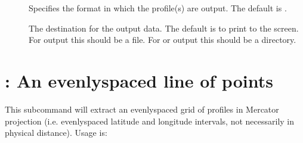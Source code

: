 \documentclass[letterpaper,10pt,english]{sphinxmanual}
\begin{document}
\sphinxAtStartPar
{}
\begin{description}
\item[{}] \leavevmode
\sphinxAtStartPar
Specifies the format in which the profile(s) are output.  The default is .

\item[{}] \leavevmode
\sphinxAtStartPar
The destination for the output data.  The default is to print to the screen.  For  output this should be a file.  For  or  output this should be a directory.

\item[{}] \leavevmode
\sphinxAtStartPar
{}

\sphinxAtStartPar
{}

\end{description}


\section{: An evenly\sphinxhyphen{}spaced line of points}
\label{\detokenize{userguide:id1}}
\sphinxAtStartPar
This subcommand will extract an evenly\sphinxhyphen{}spaced grid of profiles in Mercator projection (i.e. evenly\sphinxhyphen{}spaced latitude and longitude intervals, not necessarily in physical distance).  Usage is:
\end{document}
